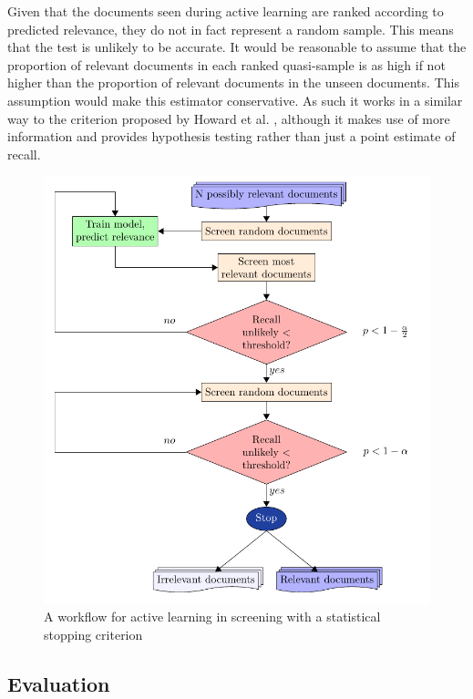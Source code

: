 \documentclass{bmcart}
\begin{document}
	Given that the documents seen during active learning are ranked according to predicted relevance, they do not in fact represent a random sample. This means that the test is unlikely to be accurate. It would be reasonable to assume that the proportion of relevant documents in each ranked quasi-sample is as high if not higher than the proportion of relevant documents in the unseen documents. This assumption would make this estimator conservative. As such it works in a similar way to the criterion proposed by Howard et al. \cite{Howard2020}, although it makes use of more information and provides hypothesis testing rather than just a point estimate of recall.
	
	
	\medskip
	
	\begin{figure}
		\includegraphics[width=0.7\linewidth]{2_figs_flow.pdf}
		\caption{A workflow for active learning in screening with a statistical stopping criterion}
		\label{flow}
	\end{figure}
	
	\subsection*{Evaluation}
	
\end{document}

